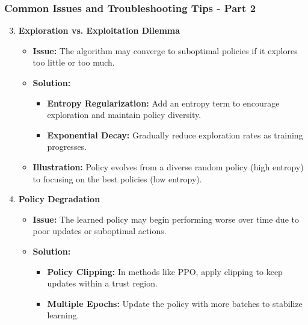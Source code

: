 \documentclass[aspectratio=169]{beamer}
\begin{document}
\begin{frame}[fragile]
    \frametitle{Common Issues and Troubleshooting Tips - Part 2}
    \begin{enumerate}
        \setcounter{enumi}{2} %
        \item \textbf{Exploration vs. Exploitation Dilemma}
          \begin{itemize}
            \item \textbf{Issue:} The algorithm may converge to suboptimal policies if it explores too little or too much.
            \item \textbf{Solution:}
              \begin{itemize}
                  \item \textbf{Entropy Regularization:} Add an entropy term to encourage exploration and maintain policy diversity.
                  \item \textbf{Exponential Decay:} Gradually reduce exploration rates as training progresses.
              \end{itemize}
            \item \textbf{Illustration:} Policy evolves from a diverse random policy (high entropy) to focusing on the best policies (low entropy).
          \end{itemize}

        \item \textbf{Policy Degradation}
          \begin{itemize}
            \item \textbf{Issue:} The learned policy may begin performing worse over time due to poor updates or suboptimal actions.
            \item \textbf{Solution:}
              \begin{itemize}
                  \item \textbf{Policy Clipping:} In methods like PPO, apply clipping to keep updates within a trust region.
                  \item \textbf{Multiple Epochs:} Update the policy with more batches to stabilize learning.
              \end{itemize}
          \end{itemize}


\end{enumerate}
\end{frame}
\end{document}
